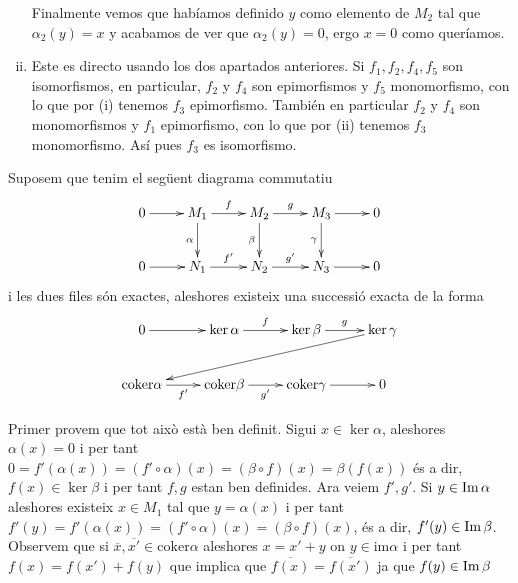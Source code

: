 \documentclass[../../../main.tex]{subfiles}
\begin{document}
\begin{sol}
\begin{enumerate}[(i)]
    Finalmente vemos que habíamos definido $y$ como elemento de $M_2$ tal que $\alpha_2(y) = x$ y acabamos de ver que $\alpha_2(y) = 0$, ergo $x = 0$ como queríamos.
    
    \item Este es directo usando los dos apartados anteriores. Si $f_1,f_2,f_4,f_5$ son isomorfismos, en particular, $f_2$ y $f_4$ son epimorfismos y $f_5$ monomorfismo, con lo que por (i) tenemos $f_3$ epimorfismo. También en particular $f_2$ y $f_4$ son monomorfismos y $f_1$ epimorfismo, con lo que por (ii) tenemos $f_3$ monomorfismo. Así pues $f_3$ es isomorfismo.
\end{enumerate} 
\end{sol}


\setcounter{exercici}{34}
\begin{exercici}
\label{exercici:lemaSerp} Suposem que tenim el següent diagrama commutatiu
\begin{equation}
    \notag
    \xymatrix{
    0 \ar[r] & M_1\ar[d]_\alpha \ar[r]^f & M_2\ar[d]_\beta\ar[r]^g & M_3\ar[d]_\gamma\ar[r] & 0 \\
    0 \ar[r] & N_1\ar[r]^{f'} & N_2\ar[r]^{g'} & N_3\ar[r] & 0
    }
\end{equation}
i les dues files són exactes, aleshores existeix una successió exacta de la forma
\begin{equation}
    \notag
    \xymatrix{
    0\ar[r]&\ker\alpha\ar[r]^f & \ker\beta\ar[r]^g & \ker \gamma\ar[dlll]\\
    \mathrm{coker}\alpha\ar[r]_{f'} & \mathrm{coker}\beta\ar[r]_{g'} & \mathrm{coker}\gamma\ar[r] & 0
    }
\end{equation}
\end{exercici}
\begin{sol}
Primer provem que tot això està ben definit. Sigui $x\in\ker\alpha$, aleshores $\alpha(x) = 0$ i per tant $0 = f'(\alpha(x)) = (f'\circ\alpha)(x) = (\beta\circ f)(x) = \beta(f(x))$ és a dir, $f(x)\in \ker\beta$ i per tant $f,g$ estan ben definides. Ara veiem $f',g'$. Si $y\in\operatorname{Im}\alpha$ aleshores existeix $x\in M_1$ tal que $y = \alpha(x)$ i per tant $f'(y) = f'(\alpha(x)) = (f'\circ\alpha)(x) = (\beta\circ f)(x)$, és a dir, $f'(y)\in\operatorname{Im}\beta$. Observem que si $\overline{x},\overline{x'}\in\mathrm{coker}\alpha$ aleshores $x = x'+y$ on $y\in\mathrm{im}\alpha$ i per tant $f(x) = f(x') + f(y)$ que implica que $\overline{f(x)} = \overline{f(x')}$ ja que $f(y)\in\operatorname{Im}\beta$
\end{sol}
\end{document}
